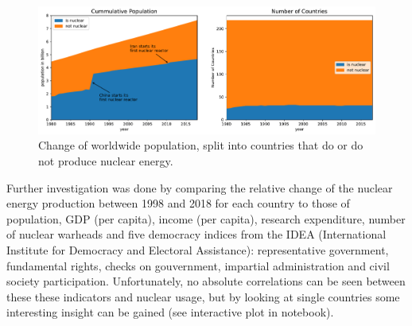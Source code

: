 \documentclass[a4paper,10pt,twocolumn]{scrartcl}
\begin{document}
\begin{figure}[hbt]
	\centering
	\includegraphics[width=\columnwidth, trim=0 0 160mm 0, clip]{../figures/q3_population.pdf}
	\caption{Change of worldwide population, split into countries that do or do not produce nuclear energy.}
	\label{fig:q3_population}
\end{figure}

Further investigation was done by comparing the relative change of the nuclear energy production between 1998 and 2018 for each country to those of population, GDP (per capita), income (per capita), research expenditure, number of nuclear warheads and five democracy indices from the IDEA (International Institute for Democracy and Electoral Assistance): representative government, fundamental rights, checks on gouvernment, impartial administration and civil society participation. Unfortunately, no absolute correlations can be seen between these these indicators and nuclear usage, but by looking at single countries some interesting insight can be gained (see interactive plot in notebook).
\end{document}
